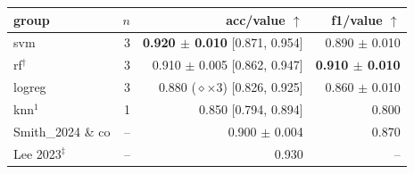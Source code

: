 \begin{tabular}{lrrr}
\toprule
group & $n$ & acc/value $\uparrow$ & f1/value $\uparrow$ \\
\midrule
svm & 3 & \textbf{0.920 $\pm$ 0.010} [0.871, 0.954] & 0.890 $\pm$ 0.010 \\
rf$^{\dagger}$ & 3 & 0.910 $\pm$ 0.005 [0.862, 0.947] & \textbf{0.910 $\pm$ 0.010} \\
logreg & 3 & 0.880 ($\diamond{\times}3$) [0.826, 0.925] & 0.860 $\pm$ 0.010 \\
knn$^{1}$ & 1 & 0.850 [0.794, 0.894] & 0.800 \\
\midrule
Smith\_2024 \& co & -- & 0.900 $\pm$ 0.004 & 0.870 \\
Lee 2023$^{\ddagger}$ & -- & 0.930 & -- \\
\bottomrule
\end{tabular}
